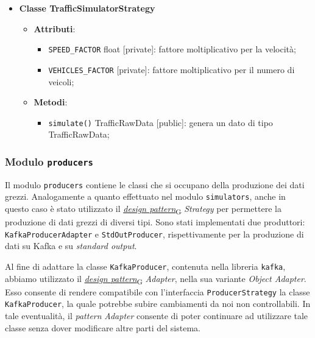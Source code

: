 \begin{itemize}
\begin{itemize}
\begin{itemize}
		            \end{itemize}
	      \end{itemize}
	\item \textbf{Classe TrafficSimulatorStrategy}
	      \begin{itemize}
		      \item \textbf{Attributi}:
		            \begin{itemize}
			            \item \texttt{SPEED\_FACTOR} float [private]: fattore moltiplicativo per la velocità;
			            \item \texttt{VEHICLES\_FACTOR} [private]: fattore moltiplicativo per il numero di veicoli;
		            \end{itemize}
		      \item \textbf{Metodi}:
		            \begin{itemize}
			            \item \texttt{simulate()} TrafficRawData [public]: genera un dato di tipo TrafficRawData;
		            \end{itemize}
	      \end{itemize}

\end{itemize}

\subsubsection{Modulo \texttt{producers}}
Il modulo \texttt{producers} contiene le classi che si occupano della produzione dei dati grezzi.
Analogamente a quanto effettuato nel modulo \texttt{simulators}, anche in questo caso è stato utilizzato il \href{https://7last.github.io/docs/pb/documentazione-interna/glossario\#design-pattern}{\textit{design pattern}\textsubscript{G}} \textit{Strategy} per permettere la produzione di dati grezzi di diversi tipi.
Sono stati implementati due produttori: \texttt{KafkaProducerAdapter} e \texttt{StdOutProducer}, rispettivamente per la produzione di dati su Kafka e su \textit{standard output}.

Al fine di adattare la classe \texttt{KafkaProducer}, contenuta nella libreria \texttt{kafka}, abbiamo utilizzato il \href{https://7last.github.io/docs/pb/documentazione-interna/glossario\#design-pattern}{\textit{design pattern}\textsubscript{G}} \textit{Adapter}, nella sua variante
\textit{Object Adapter}. Esso consente di rendere compatibile con l'interfaccia \texttt{ProducerStrategy} la classe \texttt{KafkaProducer}, la quale potrebbe subire
cambiamenti da noi non controllabili. In tale eventualità, il \textit{pattern} \textit{Adapter} consente di poter continuare ad utilizzare tale classe senza dover modificare altre parti del sistema.

